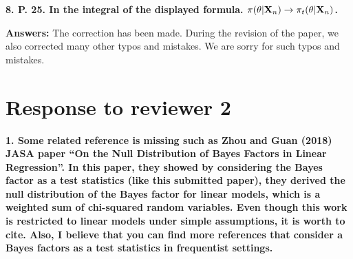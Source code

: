 \documentclass[11pt]{article}
\theoremstyle{plain}
\theoremstyle{definition}
\theoremstyle{remark}
\begin{document}
\textbf{
8.
P. 25.
In the integral of the displayed formula. $\pi(\theta | \mathbf{X}_n) \rightarrow \pi_t (\theta | \mathbf{X}_n)$.
}

\textbf{Answers:}
The correction has been made.
During the revision of the paper, we also corrected many other typos and mistakes.
We are sorry for such typos and mistakes.

\section{Response to reviewer 2}
\textbf{
    1.
    Some related reference is missing such as Zhou and Guan (2018) JASA paper “On the Null Distribution of Bayes Factors in Linear Regression”.
    In this paper, they showed by considering the Bayes factor as a test statistics (like this submitted paper), they derived the null distribution of the Bayes factor for linear models, which is a weighted sum of chi-squared random variables.
    Even though this work is restricted to linear models under simple assumptions, it is worth to cite.
    Also, I believe that you can find more references that consider a Bayes factors as a test statistics in frequentist settings.
}
\end{document}
